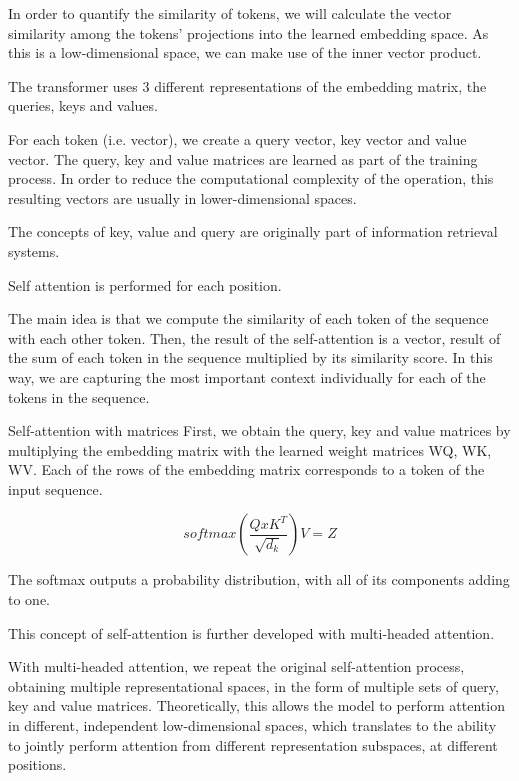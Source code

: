 In order to quantify the similarity of tokens, we will calculate the vector similarity among the tokens' projections
into the learned embedding space. As this is a low-dimensional space, we can make use of the inner vector product.

The transformer uses 3 different representations of the embedding matrix, the queries, keys and values.

For each token (i.e. vector), we create a query vector, key vector and value vector. The query, key and value matrices are
learned as part of the training process.
In order to reduce the computational complexity of the operation, this resulting vectors are usually in lower-dimensional spaces.

The concepts of key, value and query are originally part of information retrieval systems.


Self attention is performed for each position.

The main idea is that we compute the similarity of each token of the sequence with each other token. Then, the result of the 
self-attention is a vector, result of the sum of each token in the sequence multiplied by its similarity score. In this
way, we are capturing the most important context individually for each of the tokens in the sequence.


Self-attention with matrices
First, we obtain the query, key and value matrices by multiplying the embedding matrix with the learned weight matrices WQ, WK, WV.
Each of the rows of the embedding matrix corresponds to a token of the input sequence.

$$softmax(\frac{Q x K^T}{\sqrt{d_k}}) V = Z$$

The softmax outputs a probability distribution, with all of its components adding to one.

This concept of self-attention is further developed with multi-headed attention.

With multi-headed attention, we repeat the original self-attention process, obtaining multiple representational spaces, in the form of 
multiple sets of query, key and value matrices. Theoretically, this allows the model to perform attention in different, independent low-dimensional spaces, which
translates to the ability to jointly perform attention from different representation subspaces, at different positions.

